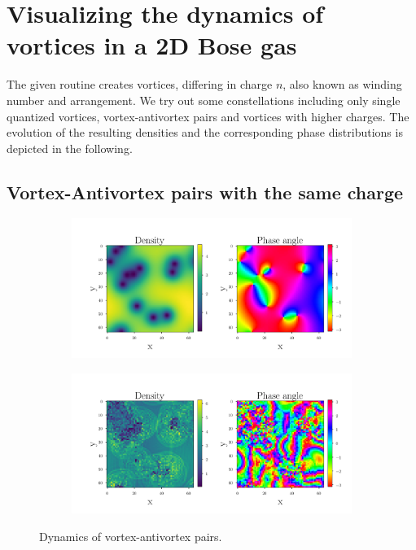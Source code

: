 \section{Visualizing the dynamics of vortices in a 2D Bose gas}

The given routine creates vortices, differing in charge $n$, also known as winding number and arrangement. We try out some constellations including only single quantized vortices, vortex-antivortex pairs and vortices with higher charges. The evolution of the resulting densities and the corresponding phase distributions is depicted in the following. 

\subsection{Vortex-Antivortex pairs with the same charge}
 \begin{figure}[H]
 \centering
 \begin{subfigure}{0.8\textwidth} 
 	\includegraphics[width= \textwidth]{figures/vortex_1_0}
 \end{subfigure} 
 \begin{subfigure}{0.8\textwidth} 
 	\includegraphics[width=\textwidth]{figures/vortex_1_50}
 \end{subfigure}
 \caption{Dynamics of vortex-antivortex pairs.}	
 \end{figure}

